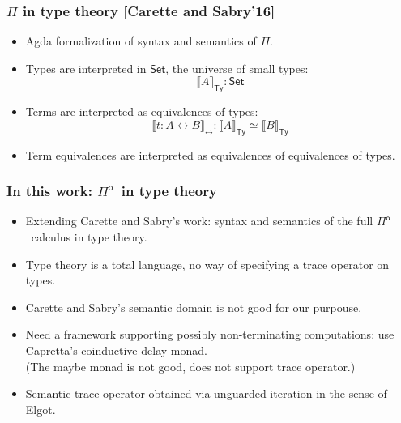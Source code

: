 \documentclass[12pt,t]{beamer}
\newcommand{\Pio}{\ensuremath{\mathsf{\Pi}^{\mathsf{o}}}}
\newcommand{\Set}{\mathsf{Set}}
\newcommand{\lr}{\longleftrightarrow}
\newcommand{\semTy}[1]{{\llbracket #1 \rrbracket}_\mathsf{Ty}}
\newcommand{\semTm}[1]{{\llbracket #1 \rrbracket}_{\lr}}
\begin{document}
\begin{frame}
  \frametitle{$\Pi$ in type theory [Carette and Sabry'16]}

  \begin{itemize}

  \item Agda formalization of syntax and
    semantics of $\Pi$.
  \item Types are interpreted in $\Set$, the universe of small types:
    \[
    \semTy A : \Set
    \]
  \item Terms are interpreted as equivalences of types:
    \[
    \semTm {t : A \lr B} : \semTy A \simeq \semTy B
    \]
  \item Term equivalences are interpreted as equivalences of
    equivalences of types.
  \end{itemize}
  
  
\end{frame}

\begin{frame}
  
  \frametitle{In this work: \Pio\ in type theory}

  \begin{itemize}
  \item Extending Carette and Sabry's work: syntax and semantics of
    the full \Pio\ calculus in type theory.
  \item Type theory is a total language, no way of specifying a trace
    operator on types.
  \item Carette and Sabry's semantic domain is not good for our
    purpouse.
    \pause
    \vspace{\fill}
  \item Need a framework supporting possibly non-terminating
    computations: use Capretta's coinductive delay monad.
    \\
    (The maybe monad is not good, does not support trace
    operator.)
   \item Semantic trace operator obtained via unguarded iteration in
     the sense of Elgot.
  \end{itemize}
  
\end{frame}
\end{document}
